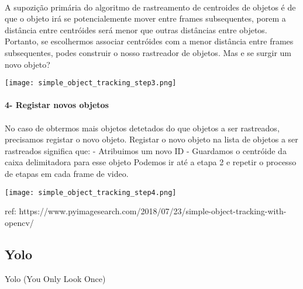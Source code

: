 \paragraph{}
A supozição primária do algoritmo de rastreamento de centroides de objetos é de que o objeto irá se potencialemente mover entre frames subsequentes, porem a distância entre centróides será menor que outras distâncias entre objetos.
\newline
Portanto, se escolhermos associar centróides com a menor distância entre frames subsequentes, podes construir o nosso rastreador de objetos.
\newline
Mas e se surgir um novo objeto? 

\begin{center}
  \texttt{[image: simple\_object\_tracking\_step3.png]}
  \label{img:centroid_traking3}  
\end{center}


\paragraph{4- Registar novos objetos}
\paragraph{}
No caso de obtermos mais objetos detetados do que objetos a ser rastreados, precisamos registar o novo objeto. Registar o novo objeto na lista de objetos a ser rastreados significa que: 
\newline - Atribuimos um novo ID
\newline - Guardamos o centróide da caixa delimitadora para esse objeto
\newline
Podemos ir até a etapa 2 e repetir o processo de etapas em cada frame de video.

\begin{center}
  \texttt{[image: simple\_object\_tracking\_step4.png]}
  \label{img:centroid_traking4}  
\end{center}



ref: 
https://www.pyimagesearch.com/2018/07/23/simple-object-tracking-with-opencv/


\subsection{Yolo}
\label{chap2:subsec:yolo}

Yolo (You Only Look Once)

